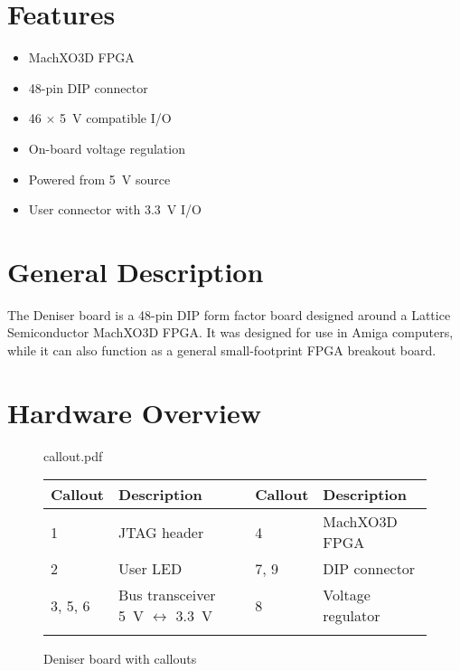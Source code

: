 \documentclass[10pt]{datasheet}
\title{\proj{}}
\author{Some Author}
\date{April 2021}
\newcommand{\proj}{Deniser board}
\begin{document}
\maketitle

\section{Features}
\begin{multicols}{2}
\begin{itemize}
\item{MachXO3D FPGA}
\item{48-pin DIP connector}
\item{46 $\times$ \SI{5}{V} compatible I/O}
\end{itemize}
\columnbreak
\begin{itemize}
\item{On-board voltage regulation}
\item{Powered from \SI{5}{V} source}
\item{User connector with \SI{3.3}{V} I/O}
\end{itemize}

\end{multicols}

\section{General Description}
The \proj{} is a 48-pin DIP form factor board designed around a Lattice
Semiconductor MachXO3D FPGA.
It was designed for use in Amiga computers, while it can also function as a
general small-footprint FPGA breakout board.

\section{Hardware Overview}

\begin{figure}[H]
\begin{center}
  \begin{includegraphics}[width=0.85\textwidth]{callout.pdf}
  \end{includegraphics}
\end{center}
    \caption{\proj{} with callouts}

\begin{tabularx}{\textwidth}{  l X | l X }
    \thickhline
    \textbf{Callout} & \textbf{Description} & \textbf{Callout} & \textbf{Description} \\
    \hline
    1 & JTAG header & 4 & MachXO3D FPGA\\
    2 & User LED                & 7, 9 & DIP connector\\
    3, 5, 6 & Bus transceiver \SI{5}{V} $\leftrightarrow$ \SI{3.3}{V} & 8 & Voltage regulator\\
    \hline
    \thickhline
\end{tabularx}
\end{figure}
\end{document}
